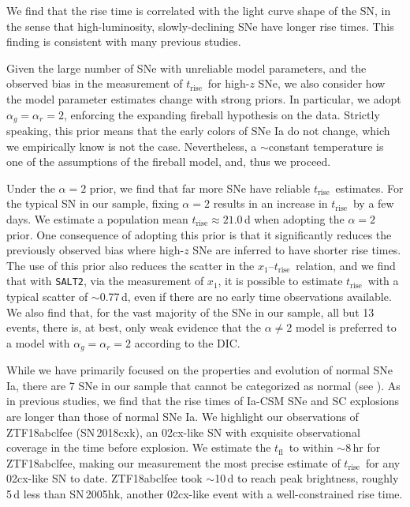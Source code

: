 \documentclass[twocolumn]{aastex63}
\newcommand{\tfl}{$t_\mathrm{fl}$}
\newcommand{\trise}{$t_\mathrm{rise}$}
\begin{document}
We find that the rise time is correlated with the light curve shape of the SN,
in the sense that high-luminosity, slowly-declining SNe have longer rise
times. This finding is consistent with many previous studies.

Given the large number of SNe with unreliable model parameters, and the
observed bias in the measurement of \trise\ for high-$z$ SNe, we also consider
how the model parameter estimates change with strong priors. In particular, we
adopt $\alpha_g = \alpha_r = 2$, enforcing the expanding fireball hypothesis
on the data. Strictly speaking, this prior means that the early colors of SNe
Ia do not change, which we empirically know is not the case. Nevertheless, a
$\sim$constant temperature is one of the assumptions of the fireball model,
and, thus we proceed.

Under the $\alpha = 2$ prior, we find that far more SNe have reliable \trise\
estimates. For the typical SN in our sample, fixing $\alpha = 2$ results in an
increase in \trise\ by a few days. We estimate a population mean \trise\;$
\approx 21.0$\,d when adopting the $\alpha = 2$ prior. One consequence of
adopting this prior is that it significantly reduces the previously observed
bias where high-$z$ SNe are inferred to have shorter rise times. The use of
this prior also reduces the scatter in the $x_1$--\trise\ relation, and we
find that with \texttt{SALT2}, via the measurement of $x_1$, it is possible to
estimate \trise\ with a typical scatter of $\sim$0.77\,d, even if there are no
early time observations available. We also find that, for the vast majority of
the SNe in our sample, all but 13 events, there is, at best, only weak
evidence that the $\alpha \ne 2$ model is preferred to a model with $\alpha_g
= \alpha_r = 2$ according to the DIC.

While we have primarily focused on the properties and evolution of normal SNe
Ia, there are 7 SNe in our sample that cannot be categorized as normal (see
\citealt{Yao19}). As in previous studies, we find that the rise times of
Ia-CSM SNe and SC explosions are longer than those of normal SNe Ia. We
highlight our observations of ZTF18abclfee (SN\,2018cxk), an 02cx-like SN with
exquisite observational coverage in the time before explosion. We estimate the
\tfl\ to within $\sim$8\,hr for ZTF18abclfee, making our measurement the most
precise estimate of \trise\ for any 02cx-like SN to date. ZTF18abclfee took
$\sim$10\,d to reach peak brightness, roughly 5\,d less than SN\,2005hk,
another 02cx-like event with a well-constrained rise time.
\end{document}
